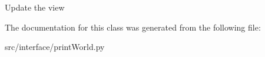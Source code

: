 \begin{DoxyVerb}Update the view \end{DoxyVerb}
 

\-The documentation for this class was generated from the following file\-:\begin{DoxyCompactItemize}
\item 
src/interface/print\-World.\-py\end{DoxyCompactItemize}
